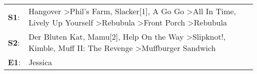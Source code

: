 \begin{supertabular}{p{0.03\textwidth}p{0.92\textwidth}}
 \textbf{S1}:  &  Hangover\textsuperscript{} \textgreater \enspace Phil's Farm\textsuperscript{}, \enspace Slacker[1]\textsuperscript{}, \enspace A Go Go\textsuperscript{} \textgreater \enspace All In Time\textsuperscript{}, \enspace Lively Up Yourself\textsuperscript{} \textgreater \enspace Rebubula\textsuperscript{} \textgreater \enspace Front Porch\textsuperscript{} \textgreater \enspace Rebubula\textsuperscript{}  \enspace  \\
 \textbf{S2}:  &                                                                                                  Der Bluten Kat\textsuperscript{}, \enspace Mamu[2]\textsuperscript{}, \enspace Help On the Way\textsuperscript{} \textgreater \enspace Slipknot!\textsuperscript{}, \enspace Kimble\textsuperscript{}, \enspace Muff II: The Revenge\textsuperscript{} \textgreater \enspace Muffburger Sandwich\textsuperscript{}  \enspace  \\
 \textbf{E1}:  &                                                                                                                                                                                                                                                                                                                                                                                           Jessica\textsuperscript{}  \enspace  \\
\end{supertabular}
